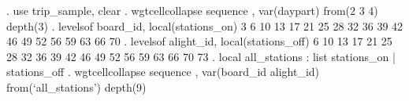 . use trip_sample, clear
{\smallskip}
. wgtcellcollapse sequence , var(daypart) from(2 3 4) depth(3)
{\smallskip}
. levelsof board_id, local(stations_on)
3 6 10 13 17 21 25 28 32 36 39 42 46 49 52 56 59 63 66 70
{\smallskip}
. levelsof alight_id, local(stations_off)
6 10 13 17 21 25 28 32 36 39 42 46 49 52 56 59 63 66 70 73
{\smallskip}
. local all_stations : list stations_on | stations_off
{\smallskip}
. wgtcellcollapse sequence , var(board_id alight_id) from(`all_stations') depth(9)
{\smallskip}
